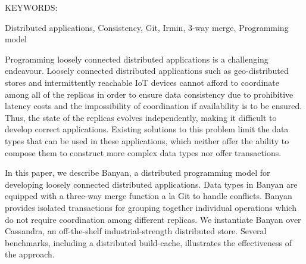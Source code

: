 \documentclass[MS]{iitmdiss}
\newcommand{\clearemptydoublepage}{\newpage{\cleardoublepage}}
\begin{document}

\abstract

\noindent KEYWORDS: \hspace*{0.5em} \parbox[t]{4.4in}{Distributed applications, Consistency, Git, Irmin, 3-way merge, Programming model}

\vspace*{24pt}

\noindent 
Programming loosely connected distributed applications is a challenging
endeavour. Loosely connected distributed applications such as geo-distributed
stores and intermittently reachable IoT devices cannot afford to coordinate
among all of the replicas in order to ensure data consistency due to
prohibitive latency costs and the impossibility of coordination if
availability is to be ensured. Thus, the state of the replicas evolves
independently, making it difficult to develop correct applications. Existing
solutions to this problem limit the data types that can be used in these
applications, which neither offer the ability to compose them to construct
more complex data types nor offer transactions.

In this paper, we describe Banyan, a distributed programming model for
developing loosely connected distributed applications. Data types in Banyan
are equipped with a three-way merge function a la Git to handle conflicts.
Banyan provides isolated transactions for grouping together individual
operations which do not require coordination among different replicas. We
instantiate Banyan over Cassandra, an off-the-shelf industrial-strength
distributed store. Several benchmarks, including a distributed build-cache,
illustrates the effectiveness of the approach.

\pagebreak


\begin{singlespace}
	\tableofcontents
	
	\clearemptydoublepage
	\listoftables
	
	
	\listoffigures
\end{singlespace}


\abbreviations
\end{document}
